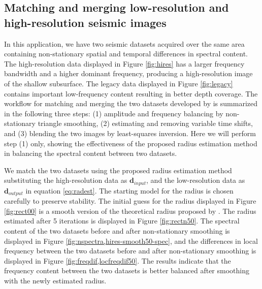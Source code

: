 \subsection{Matching and merging low-resolution and high-resolution seismic images}
In this application, we have two seismic datasets acquired over the same area containing non-stationary spatial and temporal differences in spectral content. 
The high-resolution data displayed in Figure \ref{fig:hires} has a larger frequency bandwidth and a higher dominant frequency, producing a high-resolution image of the shallow subsurface. The legacy data displayed in Figure \ref{fig:legacy} contains important low-frequency content resulting in better depth coverage. The workflow for matching and merging the two datasets developed by \cite{greerfomel2018} is summarized in the following three steps: (1) amplitude and frequency balancing by non-stationary triangle smoothing, (2) estimating and removing variable time shifts, and (3) blending the two images by least-squares inversion. Here we will perform step (1) only, showing the effectiveness of the proposed radius estimation method in balancing the spectral content between two datasets. 


We match the two datasets using the proposed radius estimation method substituting the high-resolution data as $\mathbf{d}_{input}$, and the low-resolution data as $\mathbf{d}_{output}$ in equation \ref{eq:radest}. 
The starting model for the radius is chosen carefully to preserve stability. The initial guess for the radius displayed in Figure \ref{fig:rect00} is a smooth version of the theoretical radius proposed by \cite{greerfomel2018}. The radius estimated after 5 iterations is displayed in Figure \ref{fig:rectn50}. 
The spectral content of the two datasets before and after non-stationary smoothing is displayed in Figure \ref{fig:nspectra,hires-smooth50-spec}, and the differences in local frequency between the two datasets before and after non-stationary smoothing is displayed in Figure \ref{fig:freqdif,locfreqdif50}. 
The results indicate that the frequency content between the two datasets is better balanced after smoothing with the newly estimated radius.


